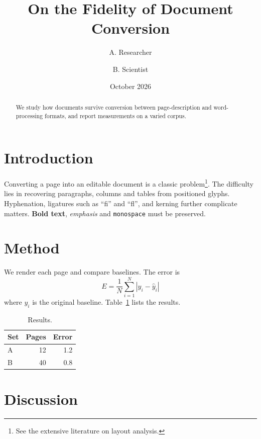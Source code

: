 \documentclass[11pt,twocolumn]{article}
\title{On the Fidelity of Document Conversion}\author{A. Researcher \and B. Scientist}\date{October 2026}
\begin{document}
\maketitle
\begin{abstract}We study how documents survive conversion between page-description and word-processing formats, and report measurements on a varied corpus.\end{abstract}
\section{Introduction}
Converting a page into an editable document is a classic problem\footnote{See the extensive literature on layout analysis.}. The difficulty lies in recovering paragraphs, columns and tables from positioned glyphs. Hyphenation, ligatures such as ``fi'' and ``fl'', and kerning further complicate matters. \textbf{Bold text}, \emph{emphasis} and \texttt{monospace} must be preserved.
\section{Method}
We render each page and compare baselines. The error is
\begin{equation} E = \frac{1}{N}\sum_{i=1}^{N} |y_i - \hat{y}_i| \end{equation}
where $y_i$ is the original baseline. Table~\ref{t} lists the results.
\begin{table}[h]\centering\begin{tabular}{|l|r|r|}\hline Set & Pages & Error \\\hline A & 12 & 1.2 \\ B & 40 & 0.8 \\\hline\end{tabular}\caption{Results.}\label{t}\end{table}
\section{Discussion}

\end{document}
